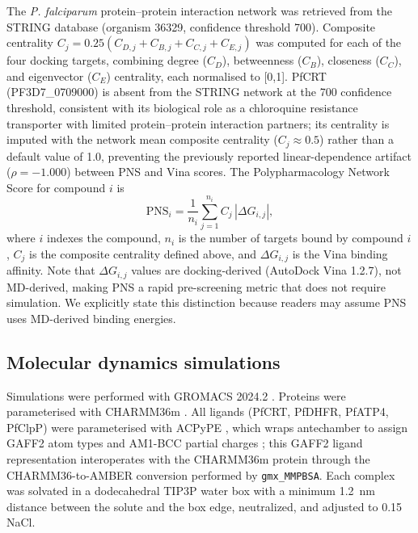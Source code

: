 \documentclass[11pt,a4paper]{article}
\begin{document}
The \textit{P. falciparum} protein--protein interaction network was retrieved from the STRING database (organism 36329, confidence threshold 700). Composite centrality $C_j = 0.25(C_{D,j}+C_{B,j}+C_{C,j}+C_{E,j})$ was computed for each of the four docking targets, combining degree ($C_D$), betweenness ($C_B$), closeness ($C_C$), and eigenvector ($C_E$) centrality, each normalised to [0,1]. PfCRT (PF3D7\_0709000) is absent from the STRING network at the 700 confidence threshold, consistent with its biological role as a chloroquine resistance transporter with limited protein--protein interaction partners; its centrality is imputed with the network mean composite centrality ($C_j \approx 0.5$) rather than a default value of 1.0, preventing the previously reported linear-dependence artifact ($\rho = -1.000$) between PNS and Vina scores. The Polypharmacology Network Score for compound $i$ is
\begin{equation}
\mathrm{PNS}_i = \frac{1}{n_i}\sum_{j=1}^{n_i} C_j\,|\Delta G_{i,j}|,
\end{equation}
where $i$ indexes the compound, $n_i$ is the number of targets bound by compound $i$, $C_j$ is the composite centrality defined above, and $\Delta G_{i,j}$ is the Vina binding affinity. Note that $\Delta G_{i,j}$ values are docking-derived (AutoDock Vina 1.2.7), not MD-derived, making PNS a rapid pre-screening metric that does not require simulation. We explicitly state this distinction because readers may assume PNS uses MD-derived binding energies.

\subsection{Molecular dynamics simulations}

Simulations were performed with GROMACS 2024.2 \citep{gromacs_2015,lindahl_2024}. Proteins were parameterised with CHARMM36m \citep{charmm36m_2017}. All ligands (PfCRT, PfDHFR, PfATP4, PfClpP) were parameterised with ACPyPE \citep{acpype2012}, which wraps antechamber to assign GAFF2 atom types and AM1-BCC partial charges \citep{wang2004gaff}; this GAFF2 ligand representation interoperates with the CHARMM36m protein through the CHARMM36-to-AMBER conversion performed by \texttt{gmx\_MMPBSA}. Each complex was solvated in a dodecahedral TIP3P water box with a minimum \SI{1.2}{\nano\metre} distance between the solute and the box edge, neutralized, and adjusted to \SI{0.15}{\molar} NaCl.
\end{document}
